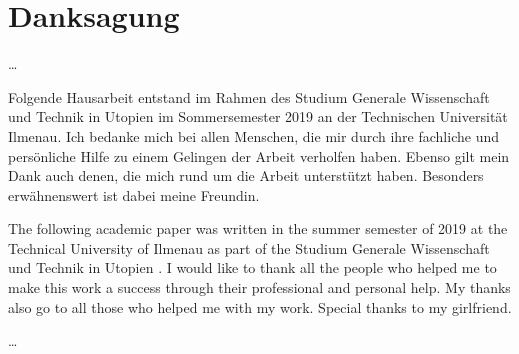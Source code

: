 \section*{Danksagung}
\ldots 
	
	Folgende Hausarbeit entstand im Rahmen des Studium Generale Wissenschaft und Technik in Utopien im Sommersemester 2019 an der Technischen Universität Ilmenau. Ich bedanke mich bei allen Menschen, die mir durch ihre fachliche und persönliche Hilfe zu einem Gelingen der Arbeit verholfen haben. Ebenso gilt mein Dank auch denen, die mich rund um die Arbeit unterstützt haben. Besonders erwähnenswert ist dabei meine Freundin.
	
	\vspace{10px}
	
	
	
	The following academic paper was written in the summer semester of 2019 at the Technical University of Ilmenau as part of the \dq Studium Generale Wissenschaft und Technik in Utopien \dq . I would like to thank all the people who helped me to make this work a success through their professional and personal help. My thanks also go to all those who helped me with my work. Special thanks to my girlfriend.
	
	
\ldots

